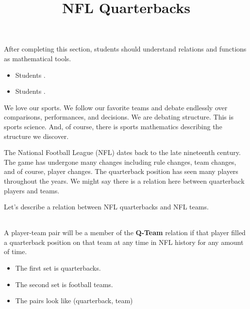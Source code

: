 \documentclass{ximera}
\title{NFL Quarterbacks}
\begin{document}
\begin{abstract}
\end{abstract}

\maketitle

\begin{sectionOutcomes}

After completing this section, students should understand relations and functions as mathematical tools. 

\begin{itemize}
\item Students .
\item Students .
\end{itemize}

\end{sectionOutcomes}





We love our sports. We follow our favorite teams and debate endlessly over comparisons, performances, and decisions. We are debating structure.  This is sports science. And, of course, there is sports mathematics describing the structure we discover.

The National Football League (NFL) dates back to the late nineteenth century.  The game has undergone many changes including rule changes, team changes, and of course, player changes. The quarterback position has seen many players throughout the years. We might say there is a relation here between quarterback players and teams.

Let's describe a relation between NFL quarterbacks and NFL teams.  



\begin{definition}
\quad \\
A player-team pair will be a member of the \textbf{Q-Team} relation if that player filled a quarterback position on that team at any time in NFL history for any amount of time.  

\begin{itemize}
\item The first set is quarterbacks.
\item The second set is football teams.
\item The pairs look like (quarterback, team)
\end{itemize}

\end{definition}
\end{document}
